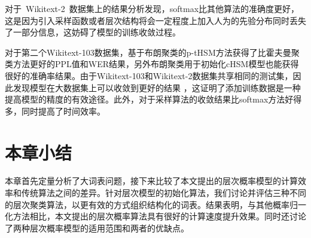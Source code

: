 对于~Wikitext-2~数据集上的结果分析发现，softmax比其他算法的准确度更好，这是因为引入采样函数或者层次结构将会一定程度上加入人为的先验分布同时丢失了一部分信息，这妨碍了模型的训练收敛过程。

对于第二个Wikitext-103数据集，基于布朗聚类的p-tHSM方法获得了比霍夫曼聚类方法更好的PPL值和WER结果，另外布朗聚类用于初始化cHSM模型也能获得很好的准确率结果。由于Wikitext-103和Wikitext-2数据集共享相同的测试集，因此发现模型在大数据集上可以收敛到更好的结果 ，这证明了添加训练数据是一种提高模型的精度的有效途径。此外，对于采样算法的收敛结果比softmax方法好得多，同时提高了时间效率。
\section{本章小结}
本章首先定量分析了大词表问题，接下来比较了本文提出的层次概率模型的计算效率和传统算法之间的差异。针对层次模型的初始化算法，我们讨论并评估三种不同的层次聚类算法，以更有效的方式组织结构化的词表。结果表明，与其他概率归一化方法相比，本文提出的层次概率算法具有很好的计算速度提升效果。同时还讨论了两种层次概率模型的适用范围和两者的优缺点。
